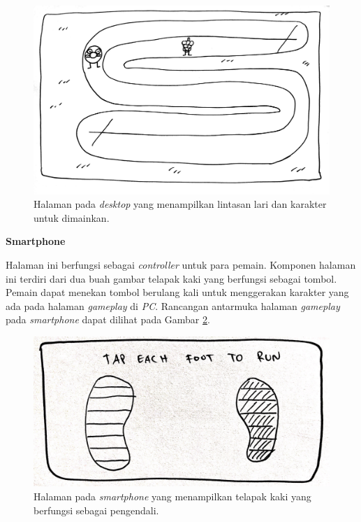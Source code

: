\begin{enumerate}
\begin{figure}[H]
	\centering
	\includegraphics[scale=0.1]{Gambar/web5_gameplay2}
	\caption{Halaman pada \textit{desktop} yang menampilkan lintasan lari dan karakter untuk dimainkan.}
	\label{fig:web5_gameplay2}
\end{figure}

	\textbf{Smartphone}
	
	Halaman ini berfungsi sebagai \textit{controller} untuk para pemain. Komponen halaman ini terdiri dari dua buah gambar telapak kaki yang berfungsi sebagai tombol. Pemain dapat menekan tombol berulang kali untuk menggerakan karakter yang ada pada halaman \textit{gameplay} di \textit{PC}. Rancangan antarmuka halaman \textit{gameplay} pada \textit{smartphone} dapat dilihat pada Gambar \ref{fig:mob5_play}.
	
\begin{figure}[H]
	\centering
	\includegraphics[scale=0.1]{Gambar/mob5_play}
	\caption{Halaman pada \textit{smartphone} yang menampilkan telapak kaki yang berfungsi sebagai pengendali.}
	\label{fig:mob5_play}
\end{figure}


\end{enumerate}
